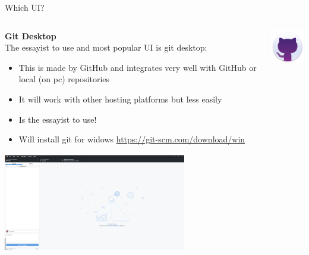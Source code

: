 \documentclass[10pt]{beamer}
\begin{document}
{\begin{frame}[fragile]{Which UI?}
\begin{columns}[T]
\begin{column}{.8\textwidth}
\textbf{Git Desktop\\}
The essayist to use and most popular UI is git desktop:
\begin{itemize}
\item This is made by GitHub and integrates very well with GitHub or local (on pc) repositories
\item It will work with other hosting platforms but less easily
\item Is the essayist to use!
\item Will install git for widows \url{https://git-scm.com/download/win}
\end{itemize}
\includegraphics[width=8cm]{Figs/GHD/outline_02}
\end{column}
\begin{column}{.2\textwidth}
\includegraphics[width=2cm]{Figs/git/gitdesktop} \newline \newline \newline 
\end{column}
\end{columns}
\end{frame}


}
\end{document}

